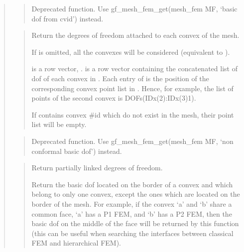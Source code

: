 \documentclass[a4paper,11pt,english]{sphinxmanual}
\begin{document}
\begin{quote}
\begin{quote}
\sphinxAtStartPar
Deprecated function. Use gf\_mesh\_fem\_get(mesh\_fem MF, ‘basic dof from cvid’) instead.
\end{quote}

\sphinxAtStartPar
{}
\begin{quote}

\sphinxAtStartPar
Return the degrees of freedom attached to each convex of the mesh.

\sphinxAtStartPar
If  is omitted, all the convexes will be considered (equivalent
to ).

\sphinxAtStartPar
{} is a row vector, .
 is a row vector containing the concatenated list
of dof of each convex in . Each entry of  is the position
of the corresponding convex point list in . Hence, for example,
the list of points of the second convex is DOFs(IDx(2):IDx(3)\sphinxhyphen{}1).

\sphinxAtStartPar
If  contains convex \#id which do not exist in the mesh, their
point list will be empty.
\end{quote}

\sphinxAtStartPar
{}
\begin{quote}

\sphinxAtStartPar
Deprecated function. Use gf\_mesh\_fem\_get(mesh\_fem MF, ‘non conformal basic dof’) instead.
\end{quote}

\sphinxAtStartPar
{}
\begin{quote}

\sphinxAtStartPar
Return partially linked degrees of freedom.

\sphinxAtStartPar
Return the basic dof located on the border of a convex and which belong
to only one convex, except the ones which are located on the border
of the mesh.  For example, if the convex ‘a’ and ‘b’ share a common
face, ‘a’ has a P1 FEM, and ‘b’ has a P2 FEM, then the basic dof on the
middle of the face will be returned by this function (this can be
useful when searching the interfaces between classical FEM and
hierarchical FEM).
\end{quote}


\end{quote}
\end{document}
